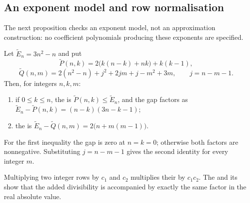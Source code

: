 \documentclass[11pt]{article}
\begin{document}
\subsection{An exponent model and row normalisation}

The next proposition checks an exponent model, not an approximation
construction: no coefficient polynomials producing these exponents
are specified.

\begin{proposition}\label{res:pade}
Let $\widetilde{E}_n=3n^{2}-n$ and put
\[
 \widetilde{P}(n,k)=2\bigl(k(n-k)+nk\bigr)+k(k-1),
\]
\[
 \widetilde{Q}(n,m)=2(n^{2}-n)+j^{2}+2jm+j-m^{2}+3m,
 \qquad j=n-m-1 .
\]
Then, for integers $n,k,m$:
\begin{enumerate}
\item if $0\le k\le n$, the
is $\widetilde{P}(n,k)\le\widetilde{E}_n$, and the gap factors as
$\widetilde{E}_n-\widetilde{P}(n,k)=(n-k)(3n-k-1)$;
\item the
is $\widetilde{E}_n-\widetilde{Q}(n,m)=2\bigl(n+m(m-1)\bigr)$.
\end{enumerate}
\end{proposition}

For the first inequality the gap is zero at $n=k=0$; otherwise both
factors are nonnegative. Substituting $j=n-m-1$ gives the second
identity for every integer $m$.

\begin{proposition}\label{res:content}
Multiplying two integer rows by $c_1$ and $c_2$ multiplies their
by $c_1c_2$. The
and its
show that the added divisibility is accompanied by exactly the same
factor in the real absolute value.
\end{proposition}
\end{document}
